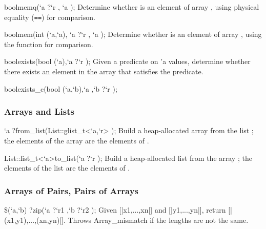 \begin{defun2}{bool}{memq}{(`a {?}`r , `a );}
  Determine whether  is an element of array , using
  physical equality (\texttt{==}) for comparison.
\end{defun2}

\begin{defun2}{bool}{mem}{(int (`a,`a), `a {?}`r , `a );}
  Determine whether  is an element of array ,
  using the function  for comparison.
\end{defun2}

\begin{defun2}{bool}{exists}{(bool (`a),`a {?}`r );}
  Given a predicate on 'a values, determine whether there exists an
  element in the array that satisfies the predicate.
\end{defun2}
\begin{defun2}{bool}{exists_c}{(bool (`a,`b),`a ,`b {?}`r );}
\end{defun2}

\subsubsection*{Arrays and Lists}

\begin{defun2}{`a ?}{from_list}{(List::glist_t<`a,`r> );}
  Build a heap-allocated array from the list ; the elements
  of the array are the elements of .
\end{defun2}

\begin{defun2}{List::list_t<`a>}{to_list}{(`a {?}`r );}
  Build a heap-allocated list from the array ; the elements of
  the list are the elements of .
\end{defun2}

\subsubsection*{Arrays of Pairs, Pairs of Arrays}

\begin{defun2}{\$(`a,`b) ?}{zip}{(`a {?}`r1 ,`b {?}`r2 );}
  Given [|x1,...,xn|] and [|y1,...,yn|], return [|(x1,y1),...,(xn,yn)|].  
  Throws Array_mismatch if the lengths are not the same.
\end{defun2}

